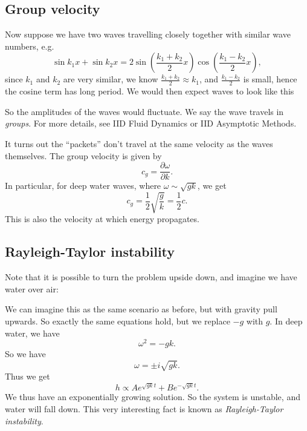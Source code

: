\documentclass[a4paper]{article}
\begin{document}
\subsection{Group velocity}
Now suppose we have two waves travelling closely together with similar wave numbers, e.g.
\[
  \sin k_1 x + \sin k_2 x = 2 \sin \left(\frac{k_1 + k_2}{2} x\right) \cos\left(\frac{k_1 - k_2}{2}x\right),
\]
since $k_1$ and $k_2$ are very similar, we know $\frac{k_1 + k_2}{2} \approx k_1$, and $\frac{k_1 - k_2}{2}$ is small, hence the cosine term has long period. We would then expect waves to look like this
\begin{center}
\end{center}
So the amplitudes of the waves would fluctuate. We say the wave travels in \emph{groups}. For more details, see IID Fluid Dynamics or IID Asymptotic Methods.

It turns out the ``packets'' don't travel at the same velocity as the waves themselves. The group velocity is given by
\[
  c_g = \frac{\partial \omega}{\partial k}.
\]
In particular, for deep water waves, where $\omega \sim \sqrt{gk}$, we get
\[
  c_g = \frac{1}{2} \sqrt{\frac{g}{k}} = \frac{1}{2}c.
\]
This is also the velocity at which energy propagates.

\subsection{Rayleigh-Taylor instability}
Note that it is possible to turn the problem upside down, and imagine we have water over air:
\begin{center}
\end{center}
We can imagine this as the same scenario as before, but with gravity pull upwards. So exactly the same equations hold, but we replace $-g$ with $g$. In deep water, we have
\[
  \omega^2 = -gk.
\]
So we have
\[
  \omega = \pm i\sqrt{gk}.
\]
Thus we get
\[
  h \propto A e^{\sqrt{gk} t} + B e^{-\sqrt{gk}t}.
\]
We thus have an exponentially growing solution. So the system is unstable, and water will fall down. This very interesting fact is known as \emph{Rayleigh-Taylor instability}.
\end{document}
